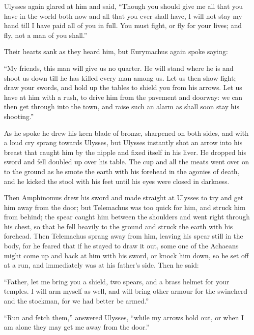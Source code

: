 Ulysses again glared at him and said, “Though you should give me all that you
have in the world both now and all that you ever shall have, I will not stay my
hand till I have paid all of you in full. You must fight, or fly for your
lives; and fly, not a man of you shall.”

Their hearts sank as they heard him, but Eurymachus again spoke saying:

“My friends, this man will give us no quarter. He will stand where he is and
shoot us down till he has killed every man among us. Let us then show fight;
draw your swords, and hold up the tables to shield you from his arrows. Let us
have at him with a rush, to drive him from the pavement and doorway: we can
then get through into the town, and raise such an alarm as shall soon stay his
shooting.”

As he spoke he drew his keen blade of bronze, sharpened on both sides, and with
a loud cry sprang towards Ulysses, but Ulysses instantly shot an arrow into his
breast that caught him by the nipple and fixed itself in his liver. He dropped
his sword and fell doubled up over his table. The cup and all the meats went
over on to the ground as he smote the earth with his forehead in the agonies of
death, and he kicked the stool with his feet until his eyes were closed in
darkness.

Then Amphinomus drew his sword and made straight at Ulysses to try and get him
away from the door; but Telemachus was too quick for him, and struck him from
behind; the spear caught him between the shoulders and went right through his
chest, so that he fell heavily to the ground and struck the earth with his
forehead. Then Telemachus sprang away from him, leaving his spear still in the
body, for he feared that if he stayed to draw it out, some one of the Achaeans
might come up and hack at him with his sword, or knock him down, so he set off
at a run, and immediately was at his father’s side. Then he said:

“Father, let me bring you a shield, two spears, and a brass helmet for your
temples. I will arm myself as well, and will bring other armour for the
swineherd and the stockman, for we had better be armed.”

“Run and fetch them,” answered Ulysses, “while my arrows hold out, or when I am
alone they may get me away from the door.”

